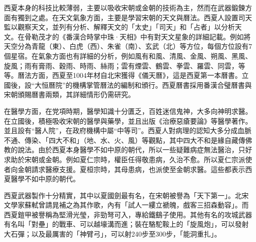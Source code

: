 西夏本身的科技比較薄弱，主要以吸收宋朝或金朝的技術為主，然而在武器鍛鍊方面有獨到之處。在天文氣象方面，主要是學習宋朝的天文與曆法。西夏人設置司天監以觀察天文，並列有分析、解釋天文的「太史」「司天」和「占者」以分析天文。在骨勒茂才的《番漢合時掌中珠·天相》中有對天文星象的詳細記載。例如將天空分為青龍（東）、白虎（西）、朱雀（南）、玄武（北）等方位，每個方位設有7個星宿。在氣象方面也有詳細的分析，例如風有和風、清風、金風、朔風、黑風、旋風；雨有膏雨、穀雨、時雨、絲雨；雲有煙雲、鶴雲、拳雲、羅雲、同雲，等等。曆法方面，西夏至1004年材自北宋獲得《儀天曆》，這是西夏第一本曆書。立國後，設“大恒曆院”的機構掌管曆法的編制和頒行。西夏曆書採用番漢合璧曆書與宋朝頒賜曆書兩類，其詳細情形仍需研究。

在醫學方面，在党項時期，醫學知識十分匱乏，百姓迷信鬼神，大多向神明求醫。在立國後，積極吸收宋朝的醫學與藥學，並且出版《治療惡瘡要論》等醫學著作。並且設有“醫人院”，在政府機構中屬“中等司”。西夏人對病理的認知大多分成血脈不通、傳染、「四大不和」（地、水、火、風）等觀點，其中四大不和是緣自藏傳佛教的說法。由於西夏本身醫學不如中原的朝代，所以一些疑難病症無法醫治，只好求助於宋朝或金朝。例如夏仁宗時，權臣任得敬患病，久治不愈。所以夏仁宗派使者向金朝請求醫療支援。夏桓宗時，其母患病，也派使至金朝求醫。這些都表示西夏醫學不如中原的朝代。

西夏武器製作十分精實，其中以夏國劍最有名，在宋朝被譽為「天下第一」。北宋文學家蘇軾曾請晁補之為其作歌，內有「試人一縷立褫魄，戲客三招森動容」。而西夏鎧甲被譽稱為堅滑光瑩，非勁弩可入，專給鐵鷂子使用。其他有名的攻城武器有名叫「對壘」的戰車、可以越壕溝而進；裝在駱駝鞍上的「旋風炮」，可以發射大石彈；以及最厲害的「神臂弓」，可以射240步至300步，「能洞重扎」。














